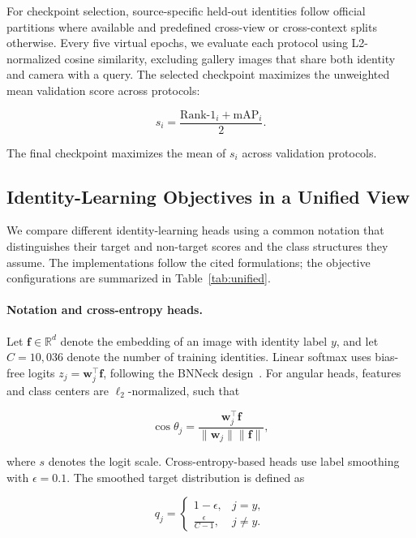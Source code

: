 \documentclass{llncs}
\begin{document}
For checkpoint selection, source-specific held-out identities follow official partitions where available and predefined cross-view or cross-context splits otherwise. Every five virtual epochs, we evaluate each protocol using L2-normalized cosine similarity, excluding gallery images that share both identity and camera with a query. The selected checkpoint maximizes the unweighted mean validation score across protocols:

\begin{equation}
s_i =
\frac{\mathrm{Rank\text{-}1}_i+\mathrm{mAP}_i}{2}.
\end{equation}

The final checkpoint maximizes the mean of $s_i$ across validation protocols.

\subsection{Identity-Learning Objectives in a Unified View}
\label{sec:objectives}

We compare different identity-learning heads using a common notation that distinguishes their target and non-target scores and the class structures they assume. The implementations follow the cited formulations; the objective configurations are summarized in Table~\ref{tab:unified}.

\paragraph{Notation and cross-entropy heads.}
Let $\mathbf{f}\in\mathbb{R}^{d}$ denote the embedding of an image with identity label $y$, and let $C=10{,}036$ denote the number of training identities. Linear softmax uses bias-free logits $z_j=\mathbf{w}_j^{\top}\mathbf{f}$, following the BNNeck design~\cite{luo2019bag}. For angular heads, features and class centers are $\ell_2$-normalized, such that

\begin{equation}
\cos\theta_j =
\frac{\mathbf{w}_j^{\top}\mathbf{f}}
{\|\mathbf{w}_j\|\|\mathbf{f}\|},
\end{equation}

where $s$ denotes the logit scale. Cross-entropy-based heads use label smoothing with $\epsilon=0.1$. The smoothed target distribution is defined as

\begin{equation}
q_j =
\begin{cases}
1-\epsilon, & j=y,\\
\frac{\epsilon}{C-1}, & j\neq y.
\end{cases}
\end{equation}
\end{document}
